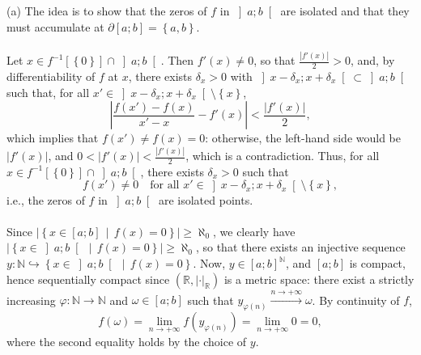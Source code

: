 \begin{solution}
    (a) The idea is to show that the zeros of \( f \) in \( \left]a;b\right[ \) are isolated and that they must accumulate at \( \partial\left[a;b\right] = \left\{a, b\right\} \).
    \\\\
    Let \( x \in f^{-1}\left[\left\{0\right\}\right] \cap \left]a;b\right[ \). Then \( f'\left(x\right) \neq 0 \), so that \( \frac{\left|f'\left(x\right)\right|}{2} > 0 \), and, by differentiability of \( f \) at \( x \), there exists \( \delta_x > 0 \) with \( \left]x-\delta_x;x+\delta_x\right[ \subset \left]a;b\right[ \) such that, for all \( x' \in \left]x-\delta_x;x+\delta_x\right[ \setminus \left\{x\right\} \),
    \[
        \left|\frac{f\left(x'\right)-f\left(x\right)}{x'-x}-f'\left(x\right)\right| < \frac{\left|f'\left(x\right)\right|}{2},
    \]
    which implies that \( f\left(x'\right) \neq f\left(x\right) = 0 \): otherwise, the left-hand side would be \( \left|f'\left(x\right)\right| \), and \( 0 < \left|f'\left(x\right)\right| < \frac{\left|f'\left(x\right)\right|}{2} \), which is a contradiction. Thus, for all \( x \in f^{-1}\left[\left\{0\right\}\right] \cap \left]a;b\right[ \), there exists \( \delta_x > 0 \) such that
    \[
    f\left(x'\right) \neq 0 \quad \text{for all } x' \in \left]x-\delta_x;x+\delta_x\right[ \setminus \left\{x\right\},
    \]
    i.e., the zeros of \( f \) in \( \left]a;b\right[ \) are isolated points.
    \\\\
    Since \( \left|\left\{ x \in \left[a;b\right] \,\middle|\, f\left(x\right) = 0 \right\}\right| \geq \aleph_0 \), we clearly have \( \left|\left\{ x \in \left]a;b\right[ \,\middle|\, f\left(x\right) = 0 \right\}\right| \geq \aleph_0 \), so that there exists an injective sequence \( y \colon \mathbb{N} \hookrightarrow \left\{ x \in \left]a;b\right[ \,\middle|\, f\left(x\right) = 0 \right\} \). Now, \( y \in \left[a;b\right]^{\mathbb{N}} \), and \( \left[a;b\right] \) is compact, hence sequentially compact since \( \left(\mathbb{R},\left|\cdot\right|_{\mathbb{R}}\right) \) is a metric space: there exist a strictly increasing \( \varphi \colon \mathbb{N} \rightarrow \mathbb{N} \) and \( \omega \in \left[a;b\right] \) such that \( y_{\varphi\left(n\right)} \overset{n \to +\infty}{\longrightarrow} \omega \). By continuity of \( f \),
    \[
        f\left(\omega\right) = \lim_{n \to +\infty} f\left(y_{\varphi\left(n\right)}\right) = \lim_{n \to +\infty} 0 = 0,
    \]
    where the second equality holds by the choice of \( y \).

\end{solution}

